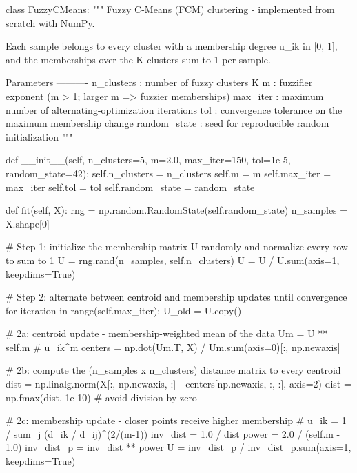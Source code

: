 \begin{codebox}[title={Fuzzy C-Means class (from scratch)}]
class FuzzyCMeans:
    """
    Fuzzy C-Means (FCM) clustering - implemented from scratch with NumPy.

    Each sample belongs to every cluster with a membership degree u_ik in [0, 1],
    and the memberships over the K clusters sum to 1 per sample.

    Parameters
    ----------
    n_clusters   : number of fuzzy clusters K
    m            : fuzzifier exponent (m > 1; larger m => fuzzier memberships)
    max_iter     : maximum number of alternating-optimization iterations
    tol          : convergence tolerance on the maximum membership change
    random_state : seed for reproducible random initialization
    """

    def __init__(self, n_clusters=5, m=2.0, max_iter=150, tol=1e-5, random_state=42):
        self.n_clusters = n_clusters
        self.m = m
        self.max_iter = max_iter
        self.tol = tol
        self.random_state = random_state

    def fit(self, X):
        rng = np.random.RandomState(self.random_state)
        n_samples = X.shape[0]

        # Step 1: initialize the membership matrix U randomly and normalize every row to sum to 1
        U = rng.rand(n_samples, self.n_clusters)
        U = U / U.sum(axis=1, keepdims=True)

        # Step 2: alternate between centroid and membership updates until convergence
        for iteration in range(self.max_iter):
            U_old = U.copy()

            # 2a: centroid update - membership-weighted mean of the data
            Um = U ** self.m                                        # u_ik^m
            centers = np.dot(Um.T, X) / Um.sum(axis=0)[:, np.newaxis]

            # 2b: compute the (n_samples x n_clusters) distance matrix to every centroid
            dist = np.linalg.norm(X[:, np.newaxis, :] - centers[np.newaxis, :, :], axis=2)
            dist = np.fmax(dist, 1e-10)  # avoid division by zero

            # 2c: membership update - closer points receive higher membership
            #     u_ik = 1 / sum_j (d_ik / d_ij)^(2/(m-1))
            inv_dist = 1.0 / dist
            power = 2.0 / (self.m - 1.0)
            inv_dist_p = inv_dist ** power
            U = inv_dist_p / inv_dist_p.sum(axis=1, keepdims=True)


\end{codebox}
